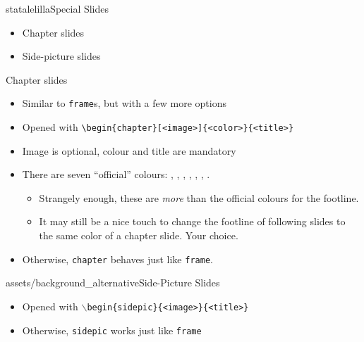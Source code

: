 \begin{chapter}{statalelilla}{Special Slides}
\begin{itemize}
    \item Chapter slides
    \item Side-picture slides
\end{itemize}
\end{chapter}


\begin{frame}[fragile]{Chapter slides}
\begin{itemize}
    \item Similar to \verb|frame|s, but with a few more options
    \item Opened with \verb|\begin{chapter}[<image>]{<color>}{<title>}|
    \item Image is optional, colour and title are mandatory
    \item There are seven ``official'' colours: , , , , , , .
    \begin{itemize}
        \item Strangely enough, these are \emph{more} than the official colours for the footline.
        \item It may still be a nice touch to change the footline of following  slides to the same color of a chapter slide. Your choice.
    \end{itemize}
    \item Otherwise, \verb|chapter| behaves just like \verb|frame|.
\end{itemize}
\end{frame}


\begin{sidepic}{assets/background_alternative}{Side-Picture Slides}
\begin{itemize}
    \item Opened with \texttt{$\backslash$begin\{sidepic\}\{<image>\}\{<title>\}}
    \item Otherwise, \texttt{sidepic} works just like \texttt{frame}
\end{itemize}
\end{sidepic}


